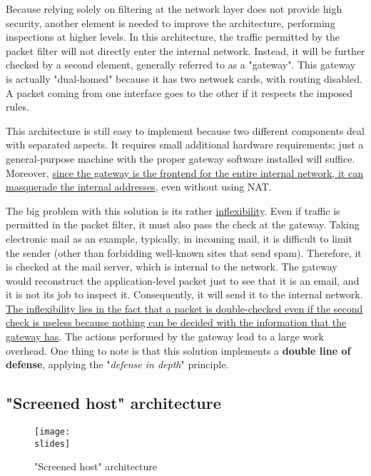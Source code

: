 Because relying solely on filtering at the network layer does not provide high security, another element is needed to improve the architecture, performing inspections at higher levels. In this architecture, the traffic permitted by the packet filter will not directly enter the internal network. Instead, it will be further checked by a second element, generally referred to as a "gateway". This gateway is actually "dual-homed" because it has two network cards, with routing disabled. A packet coming from one interface goes to the other if it respects the imposed rules.

This architecture is still easy to implement because two different components deal with separated aspects. It requires small additional hardware requirements; just a general-purpose machine with the proper gateway software installed will suffice. Moreover, \ul{since the gateway is the frontend for the entire internal network, it can masquerade the internal addresses}, even without using NAT.

The big problem with this solution is its rather \underline{inflexibility}. Even if traffic is permitted in the packet filter, it must also pass the check at the gateway. Taking electronic mail as an example, typically, in incoming mail, it is difficult to limit the sender (other than forbidding well-known sites that send spam). Therefore, it is checked at the mail server, which is internal to the network. The gateway would reconstruct the application-level packet just to see that it is an email, and it is not its job to inspect it. Consequently, it will send it to the internal network. \ul{The inflexibility lies in the fact that a packet is double-checked even if the second check is useless because nothing can be decided with the information that the gateway has}. The actions performed by the gateway lead to a large work overhead. One thing to note is that this solution implements a \textbf{double line of defense}, applying the "\textit{defense in depth}" principle.


\subsection{"Screened host" architecture}

\begin{figure}[h]
    \centering
    \texttt{[image: \\slides]}
    \caption{"Screened host" architecture}
\end{figure}


